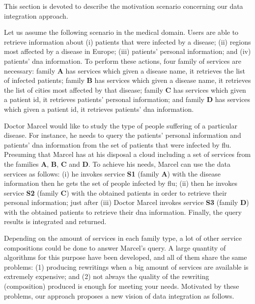 This section is devoted to describe the motivation scenario %
concerning our data integration approach.
%

Let us assume the following scenario in the medical domain. 
Users are able to retrieve information about (i) patients that were infected by a disease; 
(ii) regions most affected by a disease in Europe; 
(iii) patients' personal information; and 
(iv) patients' dna information.
To perform these actions, four family of services are necessary: family
\textbf{A} has services which given a disease name, it retrieves the list
of infected patients; family \textbf{B} has services which given a disease name,
it retrieves the list of cities most affected by that disease; family \textbf{C}
has services which given a patient id, it retrieves patients' personal
information; and family \textbf{D} has services which given a patient id, it
retrieves patients' dna information. 

Doctor Marcel would like to study the type of people suffering of a
particular disease. For instance, he needs to query the patients' personal
information and patients' dna information from the set of patients that were
infected by flu. Presuming that Marcel has at his disposal a cloud
including a set of services from the families \textbf{A}, \textbf{B}, \textbf{C} and \textbf{D}. To achieve
his needs, Marcel can use the data services as follows: (i) he invokes service
\textbf{S1} (family \textbf{A}) with the disease information then he gets the
set of people infected by flu; (ii) then he invokes service \textbf{S2} (family
\textbf{C}) with the obtained patients in order to retrieve their personal
information; just after (iii) Doctor Marcel invokes service \textbf{S3} (family
\textbf{D}) with the obtained patients to retrieve their dna information.
Finally, the query results is integrated and returned.

Depending on the amount of services in each family type, a lot of other service 
compositions could be done to answer Marcel's query. A large quantity of
algorithms for this purpose have been developed, and all of them share the same
problems: (1) producing rewritings when a big amount of services are available
is extremely expensive; and (2) not always the quality of the rewriting (composition) produced is enough for meeting your needs.
Motivated by these problems, our approach proposes a new vision of data
integration as follows.

